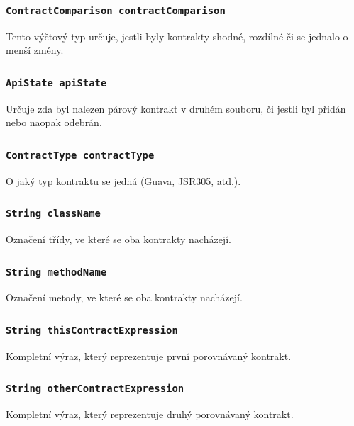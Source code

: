 			\subsubsection{\texttt{ContractComparison contractComparison}}
				Tento výčtový typ určuje, jestli byly kontrakty shodné, rozdílné či se jednalo o menší změny.
				
			\subsubsection{\texttt{ApiState apiState}}
				Určuje zda byl nalezen párový kontrakt v druhém souboru, či jestli byl přidán nebo naopak odebrán.
				
			\subsubsection{\texttt{ContractType contractType}}
				O jaký typ kontraktu se jedná (Guava, JSR305, atd.).
				
			\subsubsection{\texttt{String className}}
				Označení třídy, ve které se oba kontrakty nacházejí.
				
			\subsubsection{\texttt{String methodName}}
				Označení metody, ve které se oba kontrakty nacházejí.
				
			\subsubsection{\texttt{String thisContractExpression}}
				Kompletní výraz, který reprezentuje první porovnávaný kontrakt.
				
			\subsubsection{\texttt{String otherContractExpression}}
				Kompletní výraz, který reprezentuje druhý porovnávaný kontrakt.
			
